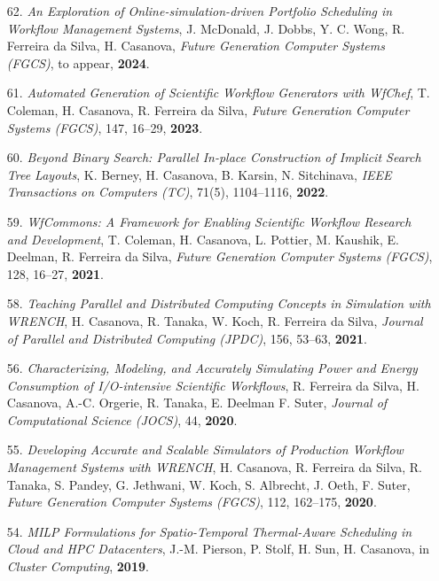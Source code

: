 
\begin{enumerate}

\item [62.] {\it An Exploration of Online-simulation-driven Portfolio Scheduling in Workflow Management Systems}, J. McDonald, J. Dobbs, Y. C. Wong, R. Ferreira da Silva, H. Casanova, \emph{Future Generation Computer Systems (FGCS)}, to appear, {\bf 2024}.

\item [61.] {\it Automated Generation of Scientific Workflow Generators with WfChef}, T. Coleman, H. Casanova, R. Ferreira da Silva, \emph{Future Generation Computer Systems (FGCS)}, 147, 16--29, {\bf 2023}.

\item [60.] {\it Beyond Binary Search: Parallel In-place Construction of Implicit Search Tree Layouts}, K. Berney, H. Casanova, B. Karsin, N. Sitchinava, \emph{IEEE Transactions on Computers (TC)}, 71(5), 1104--1116, {\bf 2022}.

\item [59.] {\it WfCommons: A Framework for Enabling Scientific Workflow Research and Development}, T. Coleman, H. Casanova, L. Pottier, M. Kaushik, E. Deelman, R. Ferreira da Silva, \emph{Future Generation Computer Systems (FGCS)}, 128, 16--27, {\bf 2021}.

\item [58.] {\it Teaching Parallel and Distributed Computing Concepts in Simulation with WRENCH}, H. Casanova, R. Tanaka, W. Koch, R. Ferreira da Silva, \emph{Journal of Parallel and Distributed Computing (JPDC)}, 156, 53--63, {\bf 2021}.

\item [56.] {\it Characterizing, Modeling, and Accurately Simulating Power and Energy Consumption of I/O-intensive Scientific Workflows}, R. Ferreira da Silva, H. Casanova, A.-C. Orgerie, R. Tanaka, E. Deelman F. Suter, \emph{Journal of Computational Science (JOCS)}, 44, {\bf 2020}.

\item [55.] {\it Developing Accurate and Scalable Simulators of Production
Workflow Management Systems with WRENCH}, H. Casanova, R. Ferreira da
Silva, R. Tanaka, S. Pandey, G. Jethwani, W. Koch, S. Albrecht, J. Oeth, F.
        Suter, \emph{Future Generation Computer Systems (FGCS)}, 112, 162--175,
{\bf 2020}.

\item [54.] {\it MILP Formulations for Spatio-Temporal Thermal-Aware Scheduling in Cloud and HPC Datacenters}, J.-M. Pierson, P. Stolf, H. Sun, H. Casanova,   in \emph{Cluster Computing}, {\bf 2019}.


\end{enumerate}
